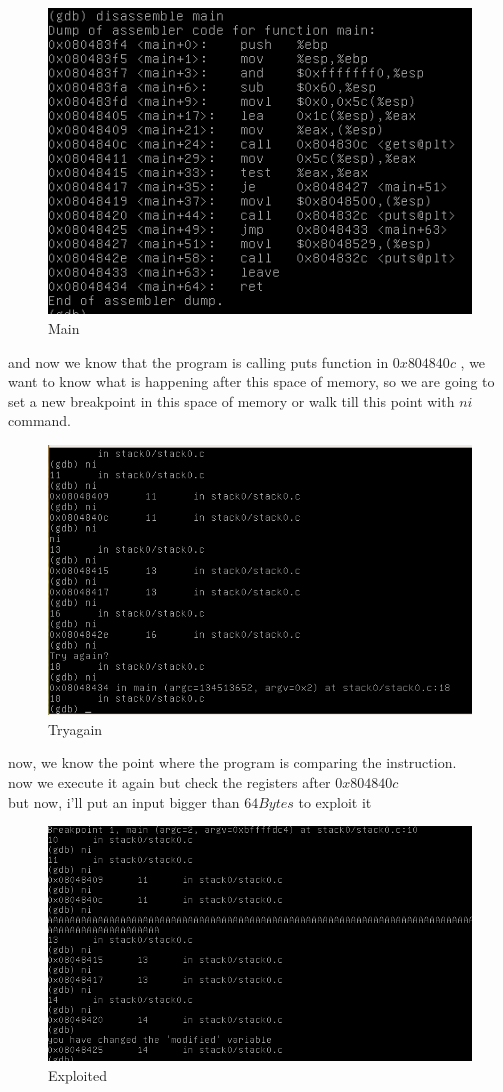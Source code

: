 \documentclass[10pt,a4paper]{article} %
\begin{document}
            \begin{figure}[h!]
                \centering
                \includegraphics[width=0.4\linewidth]{protomain.png}
                \caption{Main}
                \label{fig:protomain}
            \end{figure}
            and now we know that the program is calling puts function in $
            0x804840c  $  , we want to know what is happening after this space
            of memory, so we are going to set a new breakpoint in this space of
            memory  or walk till this point with $ ni  $ command.
            \\
            \begin{figure}[h!]
                \centering
                \includegraphics[width=0.4\linewidth]{tryagain.png}
                \caption{Tryagain}
                \label{fig:tryagain}
            \end{figure}
            now, we know the point where the program is comparing the instruction.
            \\ now we execute it again but check the registers after $ 0x804840c  $
            \\
            but now, i'll put an input bigger than $ 64Bytes  $ to exploit it
            \begin{figure}[h!]
                \centering
                \includegraphics[width=0.5\linewidth]{exploited.png}
                \caption{Exploited}
                \label{fig:exploited}
            \end{figure}
\end{document}
